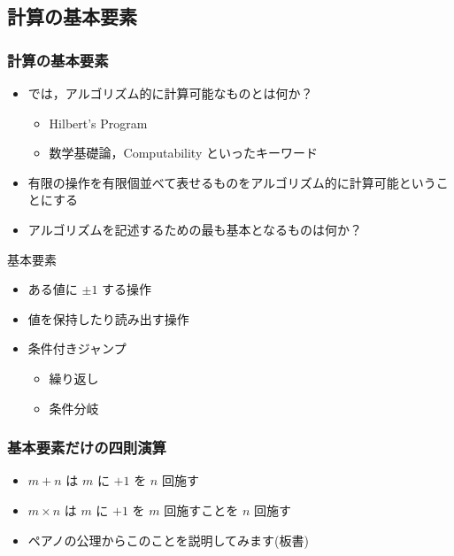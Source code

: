 \subsection{計算の基本要素}
\begin{frame}
\frametitle{計算の基本要素}
  \begin{itemize}
\item では，アルゴリズム的に計算可能なものとは何か？
    \begin{itemize}
\item Hilbert's Program
\item 数学基礎論，Computability といったキーワード
    \end{itemize}
\item 有限の操作を有限個並べて表せるものをアルゴリズム的に計算可能ということにする
\item アルゴリズムを記述するための最も基本となるものは何か？
  \end{itemize}
  \begin{block}{基本要素}
    \begin{itemize}
\item ある値に \(\pm 1\) する操作
\item 値を保持したり読み出す操作
\item 条件付きジャンプ
      \begin{itemize}
\item 繰り返し
\item 条件分岐
      \end{itemize}
    \end{itemize}
  \end{block}
\end{frame}
\begin{frame}
\frametitle{基本要素だけの四則演算}
  \begin{itemize}
\item \(m+n\) は $m$ に \(+1\) を $n$ 回施す
\item \(m\times n\) は $m$ に \(+1\) を $m$ 回施すことを $n$ 回施す
\item ペアノの公理からこのことを説明してみます(板書)
  \end{itemize}
\end{frame}
